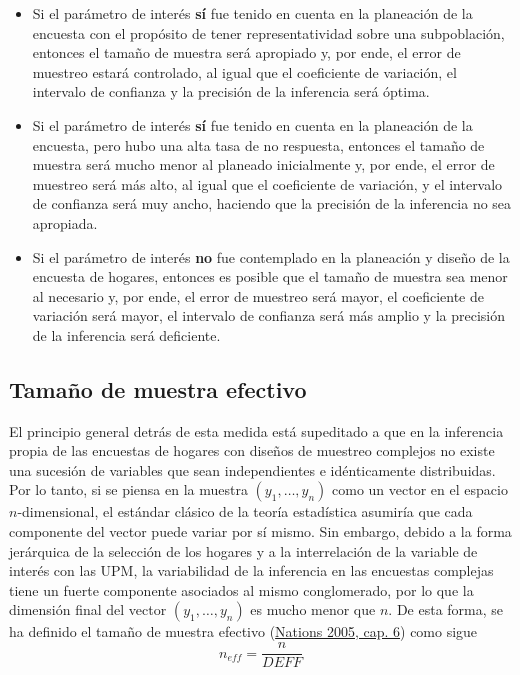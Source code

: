 \documentclass[
  12pt,
  spanish,
]{book}
\providecommand{\tightlist}{%
  \setlength{\itemsep}{0pt}\setlength{\parskip}{0pt}}
\begin{document}
\begin{itemize}
\tightlist
\item
  Si el parámetro de interés \textbf{sí} fue tenido en cuenta en la planeación de la encuesta con el propósito de tener representatividad sobre una subpoblación, entonces el tamaño de muestra será apropiado y, por ende, el error de muestreo estará controlado, al igual que el coeficiente de variación, el intervalo de confianza y la precisión de la inferencia será óptima.
\item
  Si el parámetro de interés \textbf{sí} fue tenido en cuenta en la planeación de la encuesta, pero hubo una alta tasa de no respuesta, entonces el tamaño de muestra será mucho menor al planeado inicialmente y, por ende, el error de muestreo será más alto, al igual que el coeficiente de variación, y el intervalo de confianza será muy ancho, haciendo que la precisión de la inferencia no sea apropiada.
\item
  Si el parámetro de interés \textbf{no} fue contemplado en la planeación y diseño de la encuesta de hogares, entonces es posible que el tamaño de muestra sea menor al necesario y, por ende, el error de muestreo será mayor, el coeficiente de variación será mayor, el intervalo de confianza será más amplio y la precisión de la inferencia será deficiente.
\end{itemize}

\hypertarget{tamauxf1o-de-muestra-efectivo}{%
\subsection{Tamaño de muestra efectivo}\label{tamauxf1o-de-muestra-efectivo}}

El principio general detrás de esta medida está supeditado a que en la inferencia propia de las encuestas de hogares con diseños de muestreo complejos no existe una sucesión de variables que sean independientes e idénticamente distribuidas. Por lo tanto, si se piensa en la muestra \((y_1, \ldots, y_n)\) como un vector en el espacio \(n\)-dimensional, el estándar clásico de la teoría estadística asumiría que cada componente del vector puede variar por sí mismo. Sin embargo, debido a la forma jerárquica de la selección de los hogares y a la interrelación de la variable de interés con las UPM, la variabilidad de la inferencia en las encuestas complejas tiene un fuerte componente asociados al mismo conglomerado, por lo que la dimensión final del vector \((y_1, \ldots, y_n)\) es mucho menor que \(n\). De esta forma, se ha definido el tamaño de muestra efectivo (\protect\hyperlink{ref-United_Nations_2005}{Nations 2005, cap. 6}) como sigue
\[
n_{eff} = \frac{n}{DEFF}
\]
\end{document}
